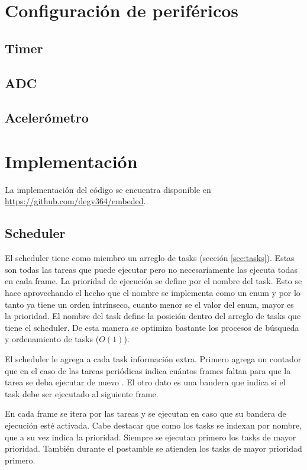 \section{Configuración de periféricos}

\subsection{Timer}

\subsection{ ADC}

\subsection{Acelerómetro}

\section{Implementación}
La implementación del código se encuentra disponible en  \url{https://github.com/degv364/embeded}.


\subsection{Scheduler}
\label{sec:scheduler}
El scheduler tiene como miembro un arreglo de tasks (sección \ref{sec:tasks}). Estas son todas las
tareas que puede ejecutar pero no necesariamente las ejecuta todas en cada frame. La prioridad de
ejecución se define por el nombre del task. Esto se hace aprovechando el hecho que el nombre se
implementa como un enum y por lo tanto ya tiene un orden intrínseco, cuanto menor se el valor del
enum, mayor es la prioridad. El nombre del task define la posición dentro del arreglo de tasks que
tiene el scheduler. De esta manera se optimiza bastante los procesos de búsqueda y ordenamiento de
tasks ($O(1)$).

El scheduler le agrega a cada task información extra. Primero agrega un contador que en el caso de
las tareas periódicas indica cuántos frames faltan para que la tarea se deba ejecutar de nuevo . El
otro dato es una bandera que indica si el task debe ser ejecutado al siguiente frame.

En cada frame se itera por las tareas y se ejecutan en caso que su bandera de ejecución esté
activada. Cabe destacar que como los tasks se indexan por nombre, que a su vez indica la
prioridad. Siempre se ejecutan primero los tasks de mayor prioridad. También durante el postamble se
atienden los tasks de mayor prioridad primero. 

